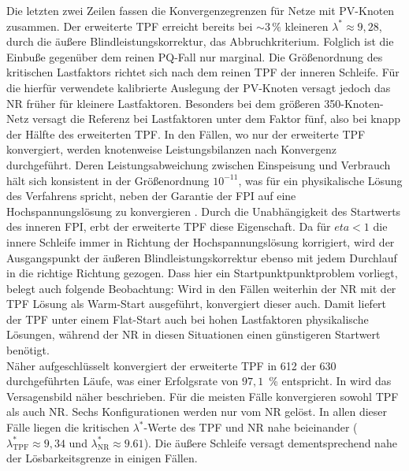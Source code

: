 Die letzten zwei Zeilen fassen die Konvergenzegrenzen für Netze mit PV-Knoten zusammen.
Der erweiterte TPF erreicht bereits bei $\sim3\,\%$ kleineren $\lambda^*\approx9,28$, durch die äußere Blindleistungskorrektur, das Abbruchkriterium.
Folglich ist die Einbuße gegenüber dem reinen PQ-Fall nur marginal. 
Die Größenordnung des kritischen Lastfaktors richtet sich nach dem reinen TPF der inneren Schleife.
Für die hierfür verwendete kalibrierte Auslegung der PV-Knoten versagt jedoch das NR früher für kleinere Lastfaktoren. 
Besonders bei dem größeren 350-Knoten-Netz versagt die Referenz bei Lastfaktoren unter dem Faktor fünf, also bei knapp der Hälfte des erweiterten TPF.
In den Fällen, wo nur der erweiterte TPF konvergiert, werden knotenweise Leistungsbilanzen nach Konvergenz durchgeführt.
Deren Leistungsabweichung zwischen Einspeisung und Verbrauch hält sich konsistent in der Größenordnung $10^{-11}$, was für ein physikalische Lösung des Verfahrens spricht, neben der Garantie der FPI auf eine Hochspannungslösung zu konvergieren \cite{Giraldo2022}.
Durch die Unabhängigkeit des Startwerts des inneren FPI, erbt der erweiterte TPF diese Eigenschaft.
Da für $eta<1$ die innere Schleife immer in Richtung der Hochspannungslösung korrigiert, wird der Ausgangspunkt der äußeren Blindleistungskorrektur ebenso mit jedem Durchlauf in die richtige Richtung gezogen.
Dass hier ein Startpunktpunktproblem vorliegt, belegt auch folgende Beobachtung: 
Wird in den Fällen weiterhin der NR mit der TPF Lösung als Warm-Start ausgeführt, konvergiert dieser auch.
Damit liefert der TPF unter einem Flat-Start auch bei hohen Lastfaktoren physikalische Lösungen, während der NR in diesen Situationen einen günstigeren Startwert benötigt.\\

Näher aufgeschlüsselt konvergiert der erweiterte TPF in 612 der 630 durchgeführten Läufe, was einer Erfolgsrate von $97{,}1$~\% entspricht.
In  wird das Versagensbild näher beschrieben.
Für die meisten Fälle konvergieren sowohl TPF als auch NR.
Sechs Konfigurationen werden nur vom NR gelöst.
In allen dieser Fälle liegen die kritischen $\lambda^*$-Werte des TPF und NR  nahe beieinander ($\lambda_\mathrm{TPF}^*\approx9,34$ und $\lambda_\mathrm{NR}^*\approx 9.61$).
Die äußere Schleife versagt dementsprechend nahe der Lösbarkeitsgrenze in einigen Fällen.
\\

